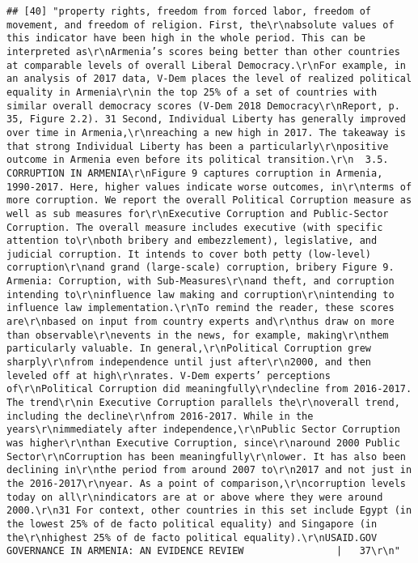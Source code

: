 \documentclass[
]{article}
\begin{document}
\begin{verbatim}
## [40] "property rights, freedom from forced labor, freedom of movement, and freedom of religion. First, the\r\nabsolute values of this indicator have been high in the whole period. This can be interpreted as\r\nArmenia’s scores being better than other countries at comparable levels of overall Liberal Democracy.\r\nFor example, in an analysis of 2017 data, V-Dem places the level of realized political equality in Armenia\r\nin the top 25% of a set of countries with similar overall democracy scores (V-Dem 2018 Democracy\r\nReport, p. 35, Figure 2.2). 31 Second, Individual Liberty has generally improved over time in Armenia,\r\nreaching a new high in 2017. The takeaway is that strong Individual Liberty has been a particularly\r\npositive outcome in Armenia even before its political transition.\r\n  3.5.       CORRUPTION IN ARMENIA\r\nFigure 9 captures corruption in Armenia, 1990-2017. Here, higher values indicate worse outcomes, in\r\nterms of more corruption. We report the overall Political Corruption measure as well as sub measures for\r\nExecutive Corruption and Public-Sector Corruption. The overall measure includes executive (with specific attention to\r\nboth bribery and embezzlement), legislative, and judicial corruption. It intends to cover both petty (low-level) corruption\r\nand grand (large-scale) corruption, bribery Figure 9. Armenia: Corruption, with Sub-Measures\r\nand theft, and corruption intending to\r\ninfluence law making and corruption\r\nintending to influence law implementation.\r\nTo remind the reader, these scores are\r\nbased on input from country experts and\r\nthus draw on more than observable\r\nevents in the news, for example, making\r\nthem particularly valuable. In general,\r\nPolitical Corruption grew sharply\r\nfrom independence until just after\r\n2000, and then leveled off at high\r\nrates. V-Dem experts’ perceptions of\r\nPolitical Corruption did meaningfully\r\ndecline from 2016-2017. The trend\r\nin Executive Corruption parallels the\r\noverall trend, including the decline\r\nfrom 2016-2017. While in the years\r\nimmediately after independence,\r\nPublic Sector Corruption was higher\r\nthan Executive Corruption, since\r\naround 2000 Public Sector\r\nCorruption has been meaningfully\r\nlower. It has also been declining in\r\nthe period from around 2007 to\r\n2017 and not just in the 2016-2017\r\nyear. As a point of comparison,\r\ncorruption levels today on all\r\nindicators are at or above where they were around 2000.\r\n31 For context, other countries in this set include Egypt (in the lowest 25% of de facto political equality) and Singapore (in the\r\nhighest 25% of de facto political equality).\r\nUSAID.GOV                                                             GOVERNANCE IN ARMENIA: AN EVIDENCE REVIEW                |   37\r\n"                                                                                                                                                                                                                                                                                                                                                                                                                                                                                                                    
\end{verbatim}
\end{document}
